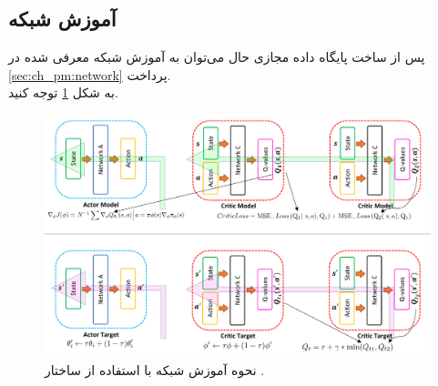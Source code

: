 \subsection{آموزش شبکه }
پس از ساخت پایگاه داده مجازی حال می‌توان به آموزش شبکه معرفی شده در \ref{sec:ch_pm:network} پرداخت.
\\
به شکل \ref{fig:ch_er:td3} توجه کنید.
\begin{figure}[!ht]
	\centering 
	\includegraphics[width=\textwidth]{img/chaps/er/td3_crop}
	\caption{نحوه آموزش شبکه با استفاده از ساختار  \cite{fujimoto2018addressing}.}    
	\label{fig:ch_er:td3}
\end{figure} 

